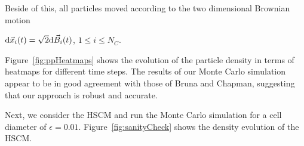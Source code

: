 Beside of this, all particles moved according to the two dimensional Brownian motion
\begin{center}
		$ \mathrm{d} \vec{x}_i(t) = \sqrt{2} \mathrm{d} \vec{B}_i(t)$, \hspace{0.5em} $1 \leq i \leq N_{C}$.
\end{center}
Figure~\ref{fig:ppHeatmaps} shows the evolution of the particle density in terms of heatmaps for different time steps. 
The results of our Monte Carlo simulation appear to be in good agreement with those of Bruna and Chapman, suggesting that our approach is robust and accurate.

Next, we consider the HSCM and run the Monte Carlo simulation for a cell diameter of $\epsilon = 0.01$. 
Figure~\ref{fig:sanityCheck} shows the density evolution of the HSCM.

